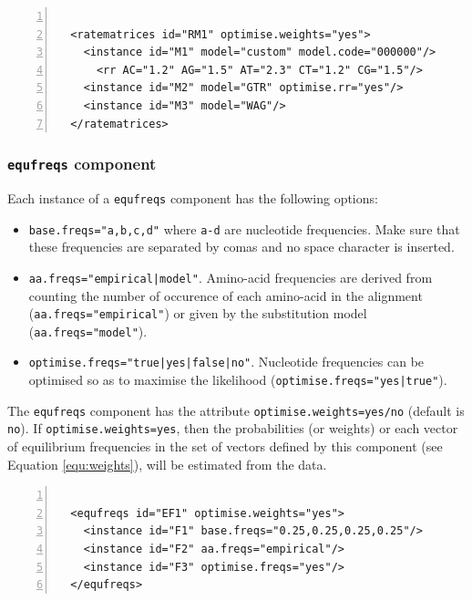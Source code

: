 \documentclass[a4paper,12pt]{article}
\newcommand{\x}[1]{\texttt{#1}}
\begin{document}
\vspace{0.2cm}
\begin{Verbatim}[frame=single, label=Example of `ratematrices' component, samepage=true,
  baselinestretch=0.5, fontsize=\small, numbers=left]

  <ratematrices id="RM1" optimise.weights="yes">
    <instance id="M1" model="custom" model.code="000000"/>
      <rr AC="1.2" AG="1.5" AT="2.3" CT="1.2" CG="1.5"/>
    <instance id="M2" model="GTR" optimise.rr="yes"/>
    <instance id="M3" model="WAG"/>
  </ratematrices>

\end{Verbatim}

\subsubsection{{\tt equfreqs} component}
Each instance of a \x{equfreqs} component has the following options:
\begin{itemize}
\item \x{base.freqs="a,b,c,d"} where \x{a-d} are nucleotide frequencies. Make sure that these
  frequencies are separated by comas and no space character is inserted.
\item \x{aa.freqs="empirical|model"}. Amino-acid frequencies are derived from counting the number of
  occurence of each amino-acid in the alignment (\x{aa.freqs="empirical"}) or given by the
  substitution model (\x{aa.freqs="model"}).
\item \x{optimise.freqs="true|yes|false|no"}. Nucleotide frequencies can be optimised so as to maximise
  the likelihood (\x{optimise.freqs="yes|true"}).
\end{itemize}

The {\tt equfreqs} component has the attribute {\tt optimise.weights=yes/no} (default is {\tt
  no}). If {\tt optimise.weights=yes}, then the probabilities (or weights) or each vector of
equilibrium frequencies in the
set of vectors defined by this component (see Equation \ref{equ:weights}), will be estimated from the data.

\vspace{0.2cm}
\begin{Verbatim}[frame=single, label=Example of `equfreqs' component, samepage=true,
  baselinestretch=0.5, fontsize=\small, numbers=left]

  <equfreqs id="EF1" optimise.weights="yes">
    <instance id="F1" base.freqs="0.25,0.25,0.25,0.25"/>
    <instance id="F2" aa.freqs="empirical"/>
    <instance id="F3" optimise.freqs="yes"/>
  </equfreqs>

\end{Verbatim}
\end{document}
